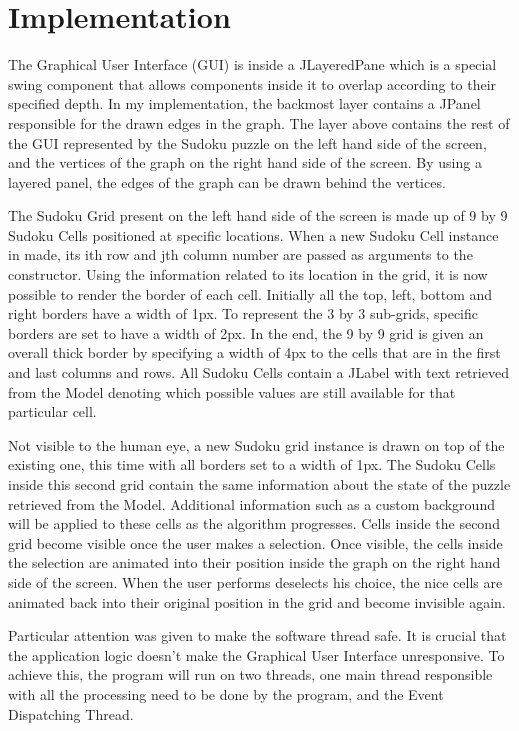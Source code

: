 \documentclass{l4proj}
\begin{document}
 
\chapter{Implementation}
\label{chap6implementation}

\noindent The Graphical User Interface (GUI) is inside a JLayeredPane which is a special swing component that allows components inside it to overlap according to their specified depth. In my implementation, the backmost layer contains a JPanel responsible for the drawn edges in the graph. The layer above contains the rest of the GUI represented by the Sudoku puzzle on the left hand side of the screen, and the vertices of the graph on the right hand side of the screen. By using a layered panel, the edges of the graph can be drawn behind the vertices.

\noindent The Sudoku Grid present on the left hand side of the screen is made up of 9 by 9 Sudoku Cells positioned at specific locations. When a new Sudoku Cell instance in made, its ith row and jth column number are passed as arguments to the constructor. Using the information related to its location in the grid, it is now possible to render the border of each cell. Initially all the top, left, bottom and right borders have a width of 1px. To represent the 3 by 3 sub-grids, specific borders are set to have a width of 2px. In the end, the 9 by 9 grid is given an overall thick border by specifying a width of 4px to the cells that are in the first and last columns and rows. All Sudoku Cells contain a JLabel with text retrieved from the Model denoting which possible values are still available for that particular cell.

\noindent Not visible to the human eye, a new Sudoku grid instance is drawn on top of the existing one, this time with all borders set to a width of 1px. The Sudoku Cells inside this second grid contain the same information about the state of the puzzle retrieved from the Model. Additional information such as a custom background will be applied to these cells as the algorithm progresses. Cells inside the second grid become visible once the user makes a selection. Once visible, the cells inside the selection are animated into their position inside the graph on the right hand side of the screen. When the user performs deselects his choice, the nice cells are animated back into their original position in the grid and become invisible again.
 
\noindent Particular attention was given to make the software thread safe. It is crucial that the application logic doesn’t make the Graphical User Interface unresponsive. To achieve this, the program will run on two threads, one main thread responsible with all the processing need to be done by the program, and the Event Dispatching Thread. 
\end{document}
